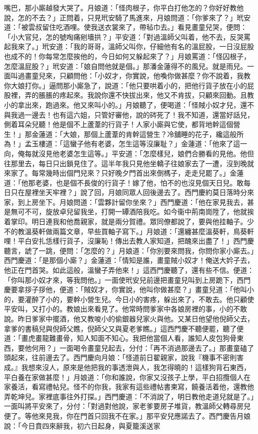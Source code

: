 嘴巴，那小廝越發大哭了。月娘道：「怪肉根子，你平白打他怎的？你好好教他說，怎的不去？」正問着，只見玳安騎了馬進來，月娘問道：「你爹來了？」玳安道：「被雲叔留住吃酒哩。使我送衣裳來了，帶毡巾去。」看見畫童兒哭，便問：「小大官兒，怎的號啕痛剜墻拱？」平安道：「對過溫師父叫着，他不去，反哭罵起我來了。」玳安道：「我的哥哥，溫師父叫你，仔細他有名的溫屁股，一日沒屁股也成不的！你每常怎麼挨他的，今日如何又躲起來了？」月娘罵道：「怪囚根子，怎麼溫屁股？」玳安道：「娘自問他就是個。」那潘金蓮得不的風兒。就是雨兒。一面叫過畫童兒來，只顧問他：「小奴才，你實說，他喚你做甚麼？你不說着，我教你大娘打你。」逼問那小廝急了，說道：「他只要哄着小的，把他行貨子放在小的屁股裡，弄的脹脹的疼起來。我說你還不快拔出來，他又不肯拔，只顧來回動。且教小的拿出來，跑過來。他又來叫小的。」月娘聽了，便喝道：「怪賊小奴才兒，還不與我過一邊去！也有這六姐，只管好審他，說的硶死了！我不知道，還當好話兒，側着耳朵兒聽！他是個不上蘆葦的行貨子！人家小廝與它使，都背地幹這個營生！」那金蓮道：「大娘，那個上蘆葦的肯幹這營生？冷舖睡的花子，纔這般所為！」孟玉樓道：「這蠻子他有老婆，怎生這等沒廉耻？」金蓮道：「他來了這一向，俺每就沒見他老婆怎生這等。」平安道：「怎麼樣兒，娘們合勝看的見他。他但往那里去，每日只出鎖見住了。這半年我只見他坐轎子往娘家去了一遭，沒到晚就來家了。每常幾時出個門兒來？只好晚夕門首出來倒榪子，走走兒罷了。」金蓮道：「他那老婆，也是個不長俊的行貨子！嫁了他，怕不的也沒見個天日兒。敢每日只在屋裡坐天牢裡？」說了回，月娘同眾人回後邊去了。西門慶約莫日落時分來家，到上房坐下。月娘問道：「雲夥計留你坐來？」西門慶道：「他在家見我去，甚是無可不可，旋放卓兒留我坐，打開一罈酒陪我吃。如今衞中荊南崗陞了，他就挨着掌印。明日連我和他喬親家，就是兩分賀禮。眾同僚都說了，要與他挂軸子。少不的教溫葵軒做兩篇文章，早些買軸子寫下。」月娘道：「還纏甚麼溫葵軒，鳥葵軒哩！平白安扎恁樣行貨子，沒廉恥！傳出去教人家知道，把醜來出盡了！」西門慶聽言，諕了一跳，便問：「怎麼的？」月娘道：「你別要來問我，你問你家小廝去。」西門慶道：「是那個小廝？」金蓮道：「情知是誰，畫童賊小奴才！俺送大妗子去，他正在門首哭。如此這般，溫蠻子弄他來！」這西門慶聽了，還有些不信。便道：「你叫那小奴才來，等我問他。」一面使玳安兒前邊把畫童兒叫到上房跪下，西門慶要拿拶子拶他，便道：「賊奴才，你實說，他叫你做甚麼？」畫童兒道：「他叫小的，要灌醉了小的，要幹小營生兒。今日小的害疼，躲出來了，不敢去。他只顧使平安叫，又打小的。教娘出來看見了。他常時問爹家中各娘房裡的事，小的不敢說。昨日爹家中擺酒，他又教唆小的偷銀器兒家火與他。又某日他望他倪師父去，拿爹的書稿兒與倪師父瞧，倪師父又與夏老爹瞧。」這西門慶不聽便罷，聽了便道：「畫虎畫龍難畫骨，知人知面不知心。我把他當個人看，誰知人皮包狗骨東西，要他何用？」一面喝令畫童兒起去，分付：「再不消過那邊去了。」那畫童磕了頭起來，往前邊去了。西門慶向月娘：「怪道前日翟親家，說我『機事不密則害成。』我想來沒人，原來是他把我的事透泄與人，我怎得曉的！這樣狗背石東西，平白養在家做甚麼！」月娘道：「你和誰說，你家又沒孩子上學，平白招攬個人在家養活，看寫禮帖兒。怪不的你我，我家有這些禮帖書柬寫，饒養活着他，還教他弄乾坤兒。家裡底事往外打探。」西門慶道：「不消說了，明日教他走道兒就是了。」一面叫將平安來了，分付：「對過對他說，家老爹要房子堆貨，教溫師父轉尋房兒便了。等他來見我，你在門首只回我不在家。」那平安兒應諾去了。西門慶告月娘說：「今日賁四來辭我，初六日起身，與夏籠溪送家